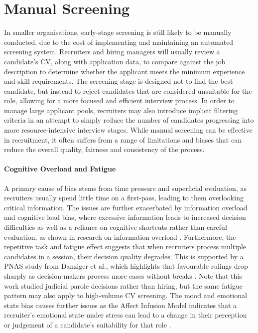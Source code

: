 \section{Manual Screening}
\label{sec:background-manual-screening}
In smaller organisations, early-stage screening is still likely to be manually conducted, 
due to the cost of implementing and maintaining an automated screening system.
Recruiters and hiring managers will usually review a candidate's CV, along 
with application data, to compare against the job description to determine 
whether the applicant meets the minimum experience and skill requirements.
The screening stage is designed not to find the best candidate, 
but instead to reject candidates that are considered unsuitable for the role, 
allowing for a more focused and efficient interview process.
In order to manage large applicant pools, recruiters may also introduce 
implicit filtering criteria in an attempt to simply reduce the number of 
candidates progressing into more resource-intensive interview stages.
While manual screening can be effective in recruitment, it often suffers 
from a range of limitations and biases that can reduce the overall quality, 
fairness and consistency of the process.

\paragraph{Cognitive Overload and Fatigue}
A primary cause of bias stems from time pressure and superficial 
evaluation, as recruiters usually spend little time on a first-pass, leading 
to them overlooking critical information.
The issues are further exacerbated by information overload and cognitive load 
bias, where excessive information leads to increased decision difficulties as 
well as a reliance on cognitive shortcuts rather than careful evaluation, as shown in research on information overload \cite{che2019}.
Furthermore, the repetitive task and fatigue effect suggests that when recruiters 
process multiple candidates in a session, their decision quality degrades.
This is supported by a PNAS study from Danziger et al., which highlights that favourable rulings drop 
sharply as decision-makers process more cases without breaks \cite{danziger2011}. 
Note that this work studied judicial parole decisions rather than hiring, but the same fatigue pattern may also apply to high-volume CV screening.
The mood and emotional state bias causes further issues as the Affect Infusion 
Model indicates that a recruiter's emotional state under stress can lead to a change 
in their perception or judgement of a candidate's suitability for that role \cite{forgas1995}.

